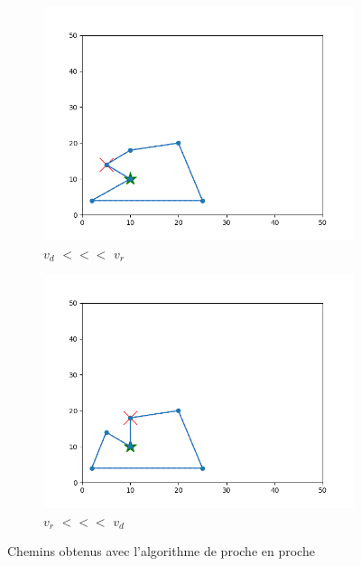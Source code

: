 \documentclass[12pt]{article}
\begin{document}
    \begin{figure}[H]
      \centering
      \begin{subfigure}{0.35\textwidth}
        \centering
        \includegraphics[width=\linewidth]{img/1cd}
        \caption{$v_d$ $<<<$ $v_r$}
        \label{subfig:terrain3mvt}
      \end{subfigure}
      \hfill
      \begin{subfigure}{0.35\textwidth}
        \centering
        \includegraphics[width=\linewidth]{img/1cr}
        \caption{$v_r$ $<<<$ $v_d$}
        \label{subfig:terrain3rot}
      \end{subfigure}
      \caption{Chemins obtenus avec l'algorithme de proche en proche}
      \label{fig:terrain1close}
    \end{figure}
\end{document}
